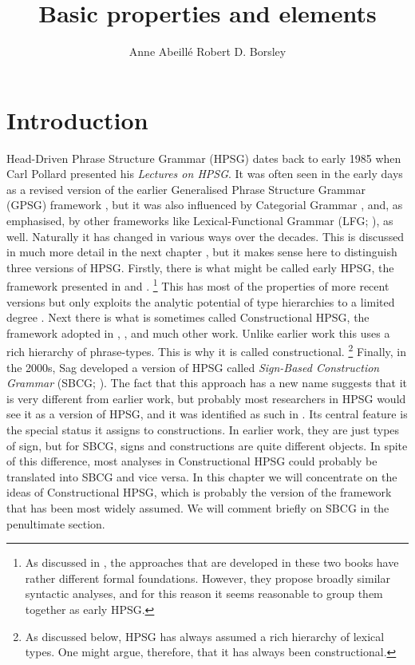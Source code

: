 \documentclass[output=paper,biblatex,babelshorthands,newtxmath,draftmode,colorlinks,citecolor=brown]{langscibook}
\title{Basic properties and elements}
\author{Anne Abeillé\affiliation{Université de Paris} \lastand Robert D. Borsley\affiliation{University of Essex and Bangor University}}
\begin{document}
\maketitle
\label{chapter-basic-properties}\label{chap-properties}

\section{Introduction}\label{sec:prop1}
\label{prop:sec-intro}

Head-Driven Phrase Structure Grammar (HPSG) dates back to early 1985 when Carl Pollard presented his
\emph{Lectures on HPSG}. It was often seen in the early days as a revised version of the earlier
Generalised Phrase Structure Grammar (GPSG) framework \citep*{GKPS85a}, but it was also influenced
by Categorial Grammar \citep{Ajdukiewicz35a-u,Steedman2000a-u}, and, as \citet[1]{ps} emphasised, by
other frameworks like Lexical-Functional Grammar (LFG; \citealt{Bresnan82a-ed}), as well. Naturally
it has changed in various ways over the decades. This is discussed in much more detail in the next
chapter \citep*{chapters/evolution}, but it makes sense here to distinguish three versions of
HPSG. Firstly, there is what might be called early HPSG, the framework presented in \citet{ps} and
\citet{ps2}.%
%
\footnote{As discussed in , the approaches that are developed in
  these two books have rather different formal foundations. However, they propose broadly similar
  syntactic analyses, and for this reason it seems reasonable to group them together as early HPSG.} 
%
This has most of the properties of more recent versions but only exploits the analytic potential of
type hierarchies to a limited degree \citep*{Flickinger87,FPW85a}. Next there is what is sometimes
called Constructional HPSG, the framework adopted in , , and much
other work. Unlike earlier work this uses a rich hierarchy of phrase-types. This is why it is called
constructional.%
%
\footnote{As discussed below, HPSG has always assumed a rich hierarchy of lexical types. One might
  argue, therefore, that it has always been constructional.} 
%
Finally, in the 2000s, Sag developed a version of HPSG called \emph{Sign-Based Construction Grammar}
(SBCG; \citealt{Sag2012a}). The fact that this approach has a new name suggests that it is very
different from earlier work, but probably most researchers in HPSG would see it as a version of
HPSG, and it was identified as such in \citet[486]{Sag2010b}. Its central feature is the special
status it assigns to constructions. In earlier work, they are just types of sign, but for SBCG,
signs and constructions are quite different objects. In spite of this difference, most analyses in
Constructional HPSG could probably be translated into SBCG and vice versa. In this chapter we will
concentrate on the ideas of Constructional HPSG, which is probably the version of the framework that
has been most widely assumed. We will comment briefly on SBCG in the penultimate section. 
\end{document}
